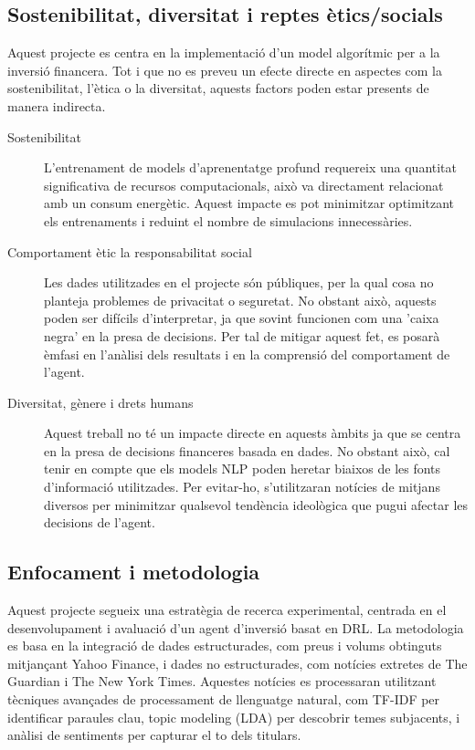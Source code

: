 \documentclass[12pt,a4paper,twoside]{book}
\begin{document}
\subsection{Sostenibilitat, diversitat i reptes ètics/socials}

Aquest projecte es centra en la implementació d’un model algorítmic per a la inversió financera. Tot i que no es preveu un efecte directe en aspectes com la sostenibilitat, l’ètica o la diversitat, aquests factors poden estar presents de manera indirecta.

\begin{description}
    \item[Sostenibilitat] L’entrenament de models d’aprenentatge profund requereix una quantitat significativa de recursos computacionals, això va directament relacionat amb un consum energètic. Aquest impacte es pot minimitzar optimitzant els entrenaments i reduint el nombre de simulacions innecessàries.
    \item[Comportament ètic la responsabilitat social] Les dades utilitzades en el projecte són públiques, per la qual cosa no planteja problemes de privacitat o seguretat. No obstant això, aquests poden ser difícils d'interpretar, ja que sovint funcionen com una 'caixa negra' en la presa de decisions. Per tal de mitigar aquest fet, es posarà èmfasi en l'anàlisi dels resultats i en la comprensió del comportament de l'agent.
    \item[Diversitat, gènere i drets humans] Aquest treball no té un impacte directe en aquests àmbits ja que se centra en la presa de decisions financeres basada en dades. No obstant això, cal tenir en compte que els models NLP poden heretar biaixos de les fonts d’informació utilitzades. Per evitar-ho, s'utilitzaran notícies de mitjans diversos per minimitzar qualsevol tendència ideològica que pugui afectar les decisions de l’agent.
\end{description}

\subsection{Enfocament i metodologia}

Aquest projecte segueix una estratègia de recerca experimental, centrada en el desenvolupament i avaluació d’un agent d’inversió basat en DRL. La metodologia es basa en la integració de dades estructurades, com preus i volums obtinguts mitjançant Yahoo Finance\cite{YahooFinance}, i dades no estructurades, com notícies extretes de The Guardian\cite{TheGuardian} i The New York Times\cite{NYTimes}. Aquestes notícies es processaran utilitzant tècniques avançades de processament de llenguatge natural, com TF-IDF per identificar paraules clau, topic modeling (LDA) per descobrir temes subjacents, i anàlisi de sentiments per capturar el to dels titulars.
\end{document}
